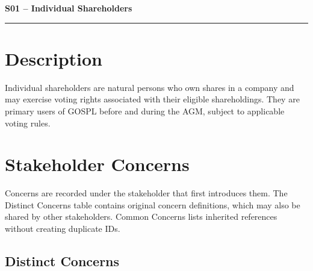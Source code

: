 \documentclass[11pt,a4paper]{article}
\begin{document}

{\LARGE\bfseries S01 -- Individual Shareholders\par}\vspace{1em}
\noindent\rule{\linewidth}{0.4pt}

\section*{Description}

Individual shareholders are natural persons who own shares in a company and may exercise voting rights associated with their eligible shareholdings. They are primary users of GOSPL before and during the AGM, subject to applicable voting rules.

\section*{Stakeholder Concerns}

Concerns are recorded under the stakeholder that first introduces them. The Distinct Concerns table contains original concern definitions, which may also be shared by other stakeholders. Common Concerns lists inherited references without creating duplicate IDs.

\subsection*{Distinct Concerns}
\end{document}
